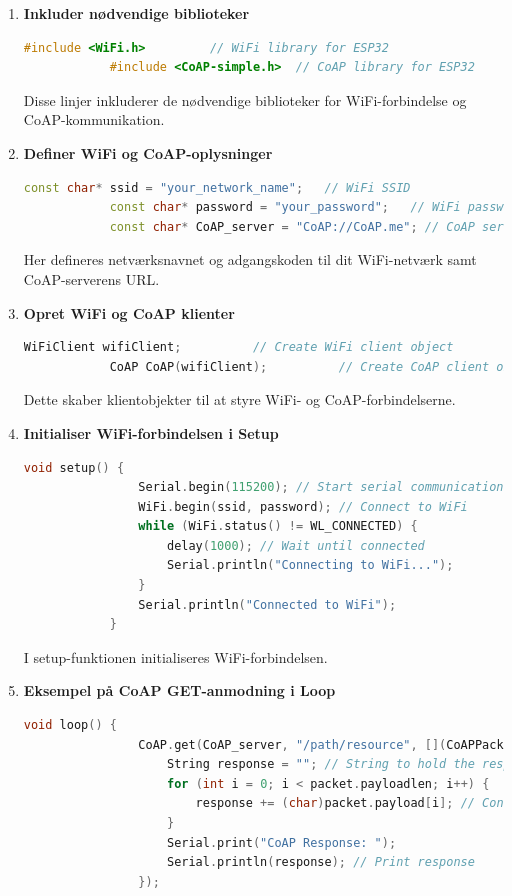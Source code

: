 \documentclass[12pt,a4paper]{book}
\begin{document}
	\begin{enumerate}
		\item \textbf{Inkluder nødvendige biblioteker}
		\begin{lstlisting}[language=C++, caption=Syntaks]
			#include <WiFi.h>         // WiFi library for ESP32
			#include <CoAP-simple.h>  // CoAP library for ESP32
		\end{lstlisting}
		\noindent Disse linjer inkluderer de nødvendige biblioteker for WiFi-forbindelse og CoAP-kommunikation.
		
		\item \textbf{Definer WiFi og CoAP-oplysninger}
		\begin{lstlisting}[language=C++, caption=Syntaks]
			const char* ssid = "your_network_name";   // WiFi SSID
			const char* password = "your_password";   // WiFi password
			const char* CoAP_server = "CoAP://CoAP.me"; // CoAP server URL
		\end{lstlisting}
		\noindent Her defineres netværksnavnet og adgangskoden til dit WiFi-netværk samt CoAP-serverens URL.
		
		\item \textbf{Opret WiFi og CoAP klienter}
		\begin{lstlisting}[language=C++, caption=Syntaks]
			WiFiClient wifiClient;          // Create WiFi client object
			CoAP CoAP(wifiClient);          // Create CoAP client object
		\end{lstlisting}
		\noindent Dette skaber klientobjekter til at styre WiFi- og CoAP-forbindelserne.
		
		\item \textbf{Initialiser WiFi-forbindelsen i Setup}
		\begin{lstlisting}[language=C++, caption=Syntaks]
			void setup() {
				Serial.begin(115200); // Start serial communication
				WiFi.begin(ssid, password); // Connect to WiFi
				while (WiFi.status() != WL_CONNECTED) {
					delay(1000); // Wait until connected
					Serial.println("Connecting to WiFi...");
				}
				Serial.println("Connected to WiFi");
			}
		\end{lstlisting}
		\noindent I setup-funktionen initialiseres WiFi-forbindelsen.
		
		\item \textbf{Eksempel på CoAP GET-anmodning i Loop}
		\begin{lstlisting}[language=C++, caption=Syntaks]
			void loop() {
				CoAP.get(CoAP_server, "/path/resource", [](CoAPPacket &packet, IPAddress ip, int port) {
					String response = ""; // String to hold the response
					for (int i = 0; i < packet.payloadlen; i++) {
						response += (char)packet.payload[i]; // Construct response string
					}
					Serial.print("CoAP Response: ");
					Serial.println(response); // Print response
				});
				

\end{lstlisting}
\end{enumerate}
\end{document}
